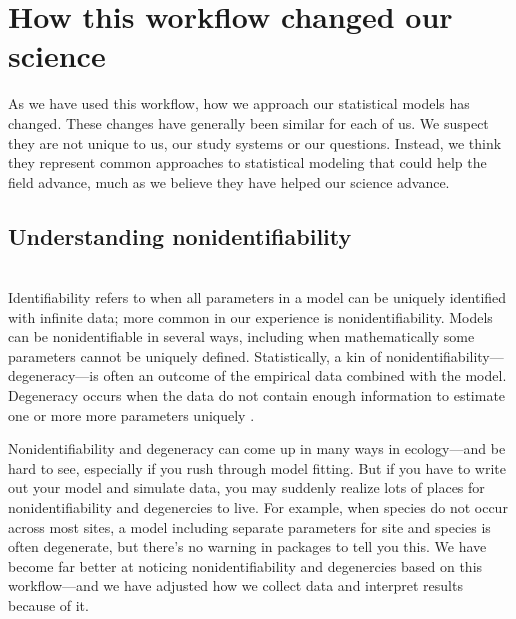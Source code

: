 \documentclass[11pt]{article}
\begin{document}

\section*{How this workflow changed our science} %

As we have used this workflow, how we approach our statistical models has changed. These changes have generally been similar for each of us. We suspect they are not unique to us, our study systems or our questions. Instead, we think they represent common approaches to statistical modeling that could help the field advance, much as we believe they have helped our science advance. 

 \subsection*{Understanding nonidentifiability} \\
Identifiability refers to when all parameters in a model can be uniquely identified with infinite data; more common in our experience is nonidentifiability. Models can be nonidentifiable in several ways, including when mathematically some parameters cannot be uniquely defined. Statistically, a kin of nonidentifiability---degeneracy---is often an outcome of the empirical data combined with the model. Degeneracy occurs when the data do not contain enough information to estimate one or more more parameters uniquely \citep{gelmanhill}. 

Nonidentifiability and degeneracy can come up in many ways in ecology---and be hard to see, especially if you rush through model fitting. But if you have to write out your model and simulate data, you may suddenly realize lots of places for nonidentifiability and degenercies to live. For example, when species do not occur across most sites, a model including separate parameters for site and species is often degenerate, but there's no warning in packages to tell you this. We have become far better at noticing nonidentifiability and degenercies based on this workflow---and we have adjusted how we collect data and interpret results because of it. 
\end{document}

